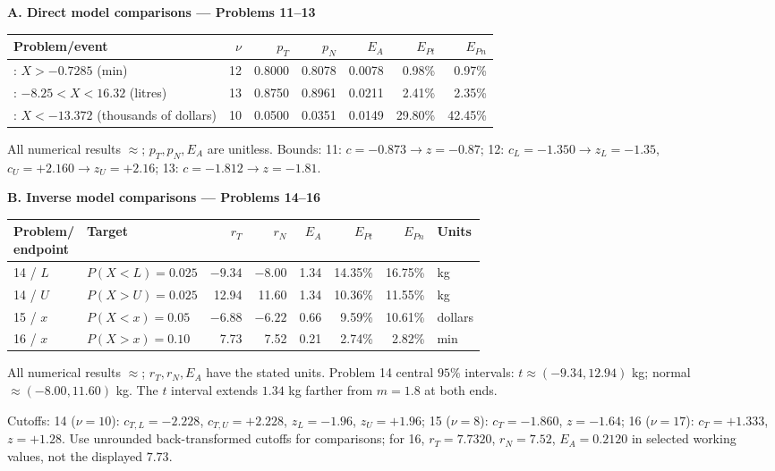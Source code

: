 \textbf{A. Direct model comparisons --- Problems 11--13}
\par\smallskip
\begin{tabularx}{\linewidth}{@{}>{\raggedright\arraybackslash}X r rrrrr@{}}
\toprule
Problem/event & $\nu$ & $p_T$ & $p_N$ & $E_A$ & $E_{Pt}$ & $E_{Pn}$ \\
\midrule
11: $X>-0.7285$ (min) & 12 & 0.8000 & 0.8078 & 0.0078 & 0.98\% & 0.97\% \\
12: $-8.25<X<16.32$ (litres) & 13 & 0.8750 & 0.8961 & 0.0211 & 2.41\% & 2.35\% \\
13: $X<-13.372$ (thousands of dollars) & 10 & 0.0500 & 0.0351 & 0.0149 & 29.80\% & 42.45\% \\
\bottomrule
\end{tabularx}
\par\smallskip
All numerical results $\approx$; $p_T,p_N,E_A$ are unitless.
Bounds: 11: $c=-0.873\to z=-0.87$;
12: $c_L=-1.350\to z_L=-1.35$, $c_U=+2.160\to z_U=+2.16$;
13: $c=-1.812\to z=-1.81$.

\textbf{B. Inverse model comparisons --- Problems 14--16}
\par\smallskip
\begin{tabularx}{\linewidth}{@{}l >{\raggedright\arraybackslash}X rrrrr l@{}}
\toprule
\shortstack[l]{Problem/\\endpoint} & Target & $r_T$ & $r_N$ & $E_A$ & $E_{Pt}$ & $E_{Pn}$ & Units \\
\midrule
14 / $L$ & $P(X<L)=0.025$ & $-9.34$ & $-8.00$ & 1.34 & 14.35\% & 16.75\% & kg \\
14 / $U$ & $P(X>U)=0.025$ & 12.94 & 11.60 & 1.34 & 10.36\% & 11.55\% & kg \\
15 / $x$ & $P(X<x)=0.05$ & $-6.88$ & $-6.22$ & 0.66 & 9.59\% & 10.61\% & dollars \\
16 / $x$ & $P(X>x)=0.10$ & 7.73 & 7.52 & 0.21 & 2.74\% & 2.82\% & min \\
\bottomrule
\end{tabularx}
\par\smallskip
All numerical results $\approx$; $r_T,r_N,E_A$ have the stated units.
Problem 14 central $95\%$ intervals:
$t\approx(-9.34,12.94)$ kg; normal $\approx(-8.00,11.60)$ kg.
The $t$ interval extends $1.34$ kg farther from $m=1.8$ at both ends.

Cutoffs: 14 ($\nu=10$): $c_{T,L}=-2.228$, $c_{T,U}=+2.228$,
$z_L=-1.96$, $z_U=+1.96$;
15 ($\nu=8$): $c_T=-1.860$, $z=-1.64$;
16 ($\nu=17$): $c_T=+1.333$, $z=+1.28$.
Use unrounded back-transformed cutoffs for comparisons;
for 16, $r_T=7.7320$, $r_N=7.52$, $E_A=0.2120$ in selected working values,
not the displayed $7.73$.

